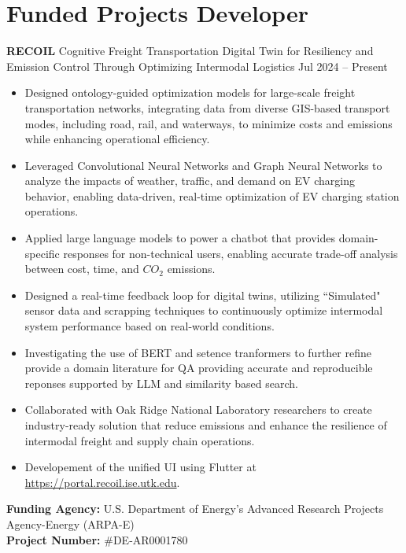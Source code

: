 \documentclass[10pt, letterpaper]{article}
\newenvironment{highlights}{
    \begin{itemize}[
        topsep=0.10 cm,
        parsep=0.10 cm,
        partopsep=0pt,
        itemsep=0pt,
        leftmargin=0 cm + 10pt
    ]
}{
    \end{itemize}
} %
\newenvironment{twocolentry}[2][]{
    \onecolentry
    \def\secondColumn{#2}
    \setcolumnwidth{\fill, 4.5 cm}
    \begin{paracol}{2}
}{
    \switchcolumn \raggedleft \secondColumn
    \end{paracol}
    \endonecolentry
} %
\begin{document}
    \section*{Funded Projects Developer}

    \begin{twocolentry}{Jul 2024 – Present} \textbf{RECOIL} \textbar Cognitive Freight Transportation Digital Twin for Resiliency and Emission Control Through Optimizing Intermodal Logistics \end{twocolentry} \begin{highlights} 
        \item Designed ontology-guided optimization models for large-scale freight transportation networks, integrating data from diverse GIS-based transport modes, including road, rail, and waterways, to minimize costs and emissions while enhancing operational efficiency. 
        \item Leveraged Convolutional Neural Networks and Graph Neural Networks to analyze the impacts of weather, traffic, and demand on EV charging behavior, enabling data-driven, real-time optimization of EV charging station operations. 
        \item Applied large language models to power a chatbot that provides domain-specific responses for non-technical users, enabling accurate trade-off analysis between cost, time, and $CO_2$ emissions.
        \item Designed a real-time feedback loop for digital twins, utilizing ``Simulated" sensor data and scrapping techniques to continuously optimize intermodal system performance based on real-world conditions.
        \item Investigating the use of BERT and setence tranformers to further refine provide a domain literature for QA providing accurate and reproducible reponses supported by LLM and similarity based search.
        \item Collaborated with Oak Ridge National Laboratory researchers to create industry-ready solution that reduce emissions and enhance the resilience of intermodal freight and supply chain operations.
        \item Developement of the unified UI using Flutter at \url{https://portal.recoil.ise.utk.edu}.
        
        \end{highlights} \vspace{0.3cm} \noindent \textbf{Funding Agency:} U.S. Department of Energy’s Advanced Research Projects Agency-Energy (ARPA-E)\\  \textbf{Project Number:} \#DE-AR0001780
\end{document}
